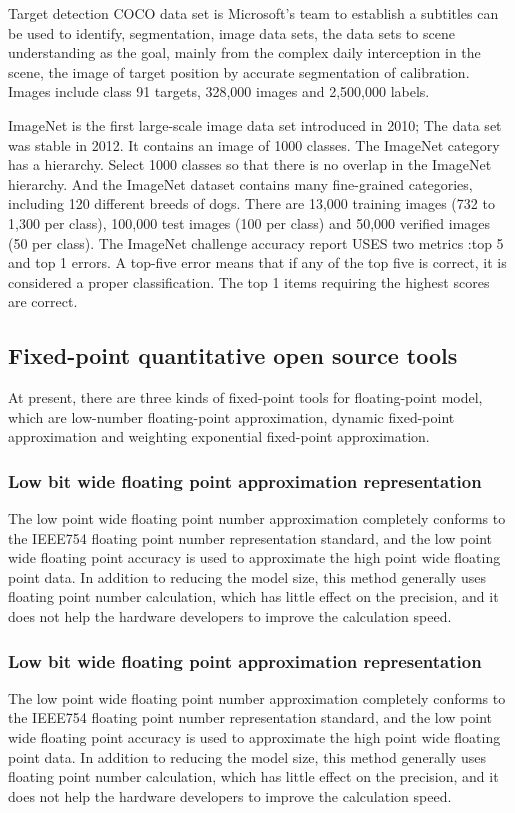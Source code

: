 Target detection COCO data set is Microsoft's team to establish a subtitles can be used to identify, segmentation, image data sets, the data sets to scene understanding as the goal, mainly from the complex daily interception in the scene, the image of target position by accurate segmentation of calibration. Images include class 91 targets, 328,000 images and 2,500,000 labels.

ImageNet is the first large-scale image data set introduced in 2010; The data set was stable in 2012. It contains an image of 1000 classes. The ImageNet category has a hierarchy. Select 1000 classes so that there is no overlap in the ImageNet hierarchy. And the ImageNet dataset contains many fine-grained categories, including 120 different breeds of dogs. There are 13,000 training images (732 to 1,300 per class), 100,000 test images (100 per class) and 50,000 verified images (50 per class). The ImageNet challenge accuracy report USES two metrics :top 5 and top 1 errors. A top-five error means that if any of the top five is correct, it is considered a proper classification. The top 1 items requiring the highest scores are correct.

\subsection{Fixed-point quantitative open source tools}
At present, there are three kinds of fixed-point tools for floating-point model, which are low-number floating-point approximation, dynamic fixed-point approximation and weighting exponential fixed-point approximation.

\subsubsection{Low bit wide floating point approximation representation}
The low point wide floating point number approximation completely conforms to the IEEE754 floating point number representation standard, and the low point wide floating point accuracy is used to approximate the high point wide floating point data. In addition to reducing the model size, this method generally uses floating point number calculation, which has little effect on the precision, and it does not help the hardware developers to improve the calculation speed.

\subsubsection{Low bit wide floating point approximation representation}
The low point wide floating point number approximation completely conforms to the IEEE754 floating point number representation standard, and the low point wide floating point accuracy is used to approximate the high point wide floating point data. In addition to reducing the model size, this method generally uses floating point number calculation, which has little effect on the precision, and it does not help the hardware developers to improve the calculation speed.

